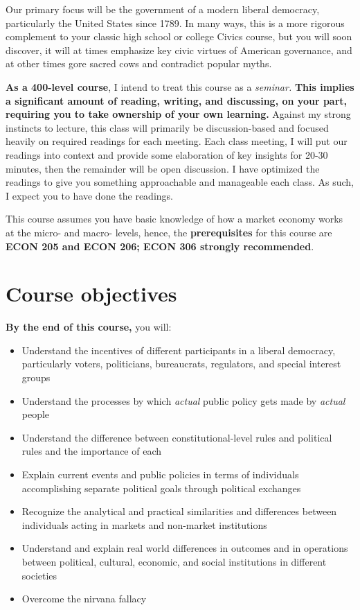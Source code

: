 \documentclass{article}
\providecommand{\tightlist}{%
  \setlength{\itemsep}{0pt}\setlength{\parskip}{0pt}}
\begin{document}
Our primary focus will be the government of a modern liberal democracy,
particularly the United States since 1789. In many ways, this is a more
rigorous complement to your classic high school or college Civics
course, but you will soon discover, it will at times emphasize key civic
virtues of American governance, and at other times gore sacred cows and
contradict popular myths.

\textbf{As a 400-level course}, I intend to treat this course as a
\emph{seminar.} \textbf{This implies a significant amount of reading,
writing, and discussing, on your part, requiring you to take ownership
of your own learning.} Against my strong instincts to lecture, this
class will primarily be discussion-based and focused heavily on required
readings for each meeting. Each class meeting, I will put our readings
into context and provide some elaboration of key insights for 20-30
minutes, then the remainder will be open discussion. I have optimized
the readings to give you something approachable and manageable each
class. As such, I expect you to have done the readings.

This course assumes you have basic knowledge of how a market economy
works at the micro- and macro- levels, hence, the \textbf{prerequisites}
for this course are \textbf{ECON 205 and ECON 206; ECON 306 strongly
recommended}.

\hypertarget{course-objectives}{%
\section{Course objectives}\label{course-objectives}}

\textbf{By the end of this course,} you will:

\begin{itemize}
\tightlist
\item
  Understand the incentives of different participants in a liberal
  democracy, particularly voters, politicians, bureaucrats, regulators,
  and special interest groups
\item
  Understand the processes by which \emph{actual} public policy gets
  made by \emph{actual} people
\item
  Understand the difference between constitutional-level rules and
  political rules and the importance of each
\item
  Explain current events and public policies in terms of individuals
  accomplishing separate political goals through political exchanges
\item
  Recognize the analytical and practical similarities and differences
  between individuals acting in markets and non-market institutions
\item
  Understand and explain real world differences in outcomes and in
  operations between political, cultural, economic, and social
  institutions in different societies
\item
  Overcome the nirvana fallacy
\end{itemize}
\end{document}
